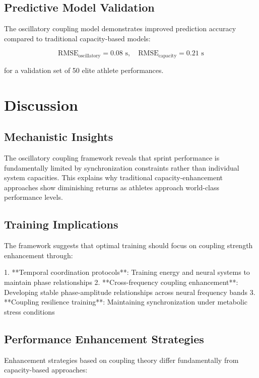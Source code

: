 \documentclass[twocolumn]{article}
\begin{document}
\subsection{Predictive Model Validation}

The oscillatory coupling model demonstrates improved prediction accuracy compared to traditional capacity-based models:

\begin{equation}
\text{RMSE}_{\text{oscillatory}} = 0.08 \text{ s}, \quad \text{RMSE}_{\text{capacity}} = 0.21 \text{ s}
\label{eq:prediction_accuracy}
\end{equation}

for a validation set of 50 elite athlete performances.

\section{Discussion}

\subsection{Mechanistic Insights}

The oscillatory coupling framework reveals that sprint performance is fundamentally limited by synchronization constraints rather than individual system capacities. This explains why traditional capacity-enhancement approaches show diminishing returns as athletes approach world-class performance levels.

\subsection{Training Implications}

The framework suggests that optimal training should focus on coupling strength enhancement through:

1. **Temporal coordination protocols**: Training energy and neural systems to maintain phase relationships
2. **Cross-frequency coupling enhancement**: Developing stable phase-amplitude relationships across neural frequency bands
3. **Coupling resilience training**: Maintaining synchronization under metabolic stress conditions

\subsection{Performance Enhancement Strategies}

Enhancement strategies based on coupling theory differ fundamentally from capacity-based approaches:
\end{document}
